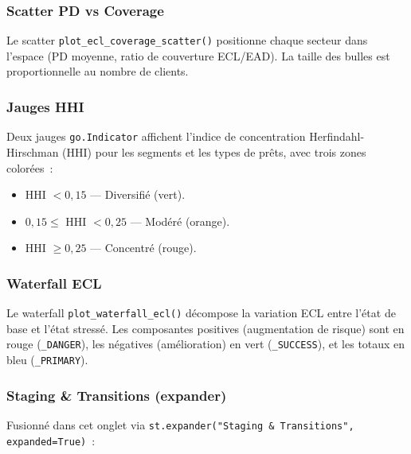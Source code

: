 \documentclass[12pt,a4paper]{article}
\begin{document}
\subsubsection{Scatter PD vs Coverage}

Le scatter \texttt{plot\_ecl\_coverage\_scatter()} positionne chaque secteur dans l'espace (PD moyenne, ratio de couverture ECL/EAD). La taille des bulles est proportionnelle au nombre de clients.

\subsubsection{Jauges HHI}

Deux jauges \texttt{go.Indicator} affichent l'indice de concentration Herfindahl-Hirschman (HHI) pour les segments et les types de pr\^ets, avec trois zones color\'ees~:

\begin{formulebox}
\begin{itemize}[leftmargin=1em]
    \item HHI $< 0{,}15$ --- \textcolor{accentgreen}{Diversifi\'e} (vert).
    \item $0{,}15 \leq$ HHI $< 0{,}25$ --- \textcolor{accentorange}{Mod\'er\'e} (orange).
    \item HHI $\geq 0{,}25$ --- \textcolor{accentred}{Concentr\'e} (rouge).
\end{itemize}
\end{formulebox}

\subsubsection{Waterfall ECL}

Le waterfall \texttt{plot\_waterfall\_ecl()} d\'ecompose la variation ECL entre l'\'etat de base et l'\'etat stress\'e. Les composantes positives (augmentation de risque) sont en rouge (\texttt{\_DANGER}), les n\'egatives (am\'elioration) en vert (\texttt{\_SUCCESS}), et les totaux en bleu (\texttt{\_PRIMARY}).

\subsubsection{Staging \& Transitions (expander)}

Fusionn\'e dans cet onglet via \texttt{st.expander("Staging \& Transitions", expanded=True)}~:
\end{document}
